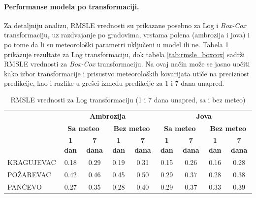 \documentclass[12pt]{article}
\begin{document}
\paragraph{\textbf{Performanse modela po transformaciji.}}  
Za detaljniju analizu, RMSLE vrednosti su prikazane posebno za Log i \textit{Box-Cox} transformaciju, uz razdvajanje po gradovima, vrstama polena (ambrozija i jova) i po tome da li su meteorološki parametri uključeni u model ili ne.  
Tabela \ref{tab:rmsle_log} prikazuje rezultate za Log transformaciju, dok tabela \ref{tab:rmsle_boxcox} sadrži RMSLE vrednosti za \textit{Box-Cox} transformaciju.  
Na ovaj način može se jasno uočiti kako izbor transformacije i prisustvo meteoroloških kovarijata utiče na preciznost predikcije, kao i razlike u grešci između predikcije za 1 i 7 dana unapred.

\begin{table}[h!]
\centering
\caption{RMSLE vrednosti za Log transformaciju (1 i 7 dana unapred, sa i bez meteo)}
\begin{tabular}{|l|c|c|c|c||c|c|c|c|}
\hline
\label{tab:rmsle_log}
\multirow{3}{*}{\textbf{Grad}} 
& \multicolumn{4}{c||}{\textbf{Ambrozija}} 
& \multicolumn{4}{c|}{\textbf{Jova}} \\ \cline{2-9}
& \multicolumn{2}{c|}{\textbf{Sa meteo}} & \multicolumn{2}{c||}{\textbf{Bez meteo}} 
& \multicolumn{2}{c|}{\textbf{Sa meteo}} & \multicolumn{2}{c|}{\textbf{Bez meteo}} \\ \cline{2-9}
& \textbf{1 dan} & \textbf{7 dana} & \textbf{1 dan} & \textbf{7 dana} 
& \textbf{1 dan} & \textbf{7 dana} & \textbf{1 dan} & \textbf{7 dana} \\ \hline
KRAGUJEVAC     & 0.18 & 0.29 & 0.19 & 0.31 & 0.15 & 0.26 & 0.16 & 0.28 \\ \hline
POŽAREVAC & 0.42 & 0.46 & 0.45 & 0.50 & 0.29 & 0.37 & 0.28 & 0.38 \\ \hline
PANČEVO        & 0.27 & 0.35 & 0.28 & 0.40 & 0.29 & 0.37 & 0.33 & 0.39 \\ \hline
\end{tabular}
\end{table}
\end{document}
